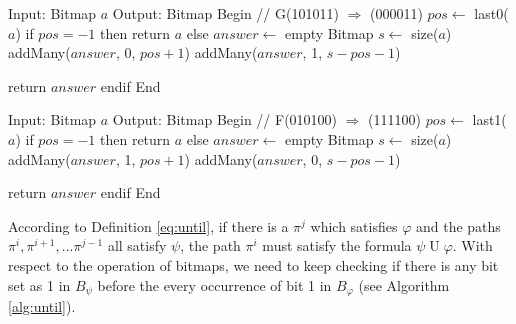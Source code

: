 \begin{algo}[caption=\textbf{G}lobal, label={alg:global}]
Input: Bitmap $a$
Output: Bitmap
Begin
  // G(101011) $\Rightarrow$ (000011)
  $pos \gets$ last0($a$)
  if $pos = -1$ then
    return $a$
  else
    $answer \gets$ empty Bitmap
    $s \gets$ size($a$)
    addMany($answer$, 0, $pos + 1$)
    addMany($answer$, 1, $s - pos - 1$)
    
    return $answer$
  endif
End
\end{algo}

\begin{algo}[caption=\textbf{F}uture, label={alg:future}]
Input: Bitmap $a$
Output: Bitmap
Begin
  // F(010100) $\Rightarrow$ (111100)
  $pos \gets$ last1($a$)
  if $pos = -1$ then
    return $a$
  else
    $answer \gets$ empty Bitmap
    $s \gets$ size($a$)
    addMany($answer$, 1, $pos + 1$)
    addMany($answer$, 0, $s - pos - 1$)
    
    return $answer$
  endif
End
\end{algo}

According to Definition \eqref{eq:until}, if there is a $\pi^j$ which satisfies $\varphi$ and the paths $\pi^i, \pi^{i + 1}, ... \pi^{j - 1}$ all satisfy $\psi$, the path $\pi^i$ must satisfy the formula $\psi \mathrel{U} \varphi$. With respect to the operation of bitmaps, we need to keep checking if there is any bit set as 1 in $B_{\psi}$ before the every occurrence of bit 1 in $B_{\varphi}$ (see Algorithm \ref{alg:until}).


